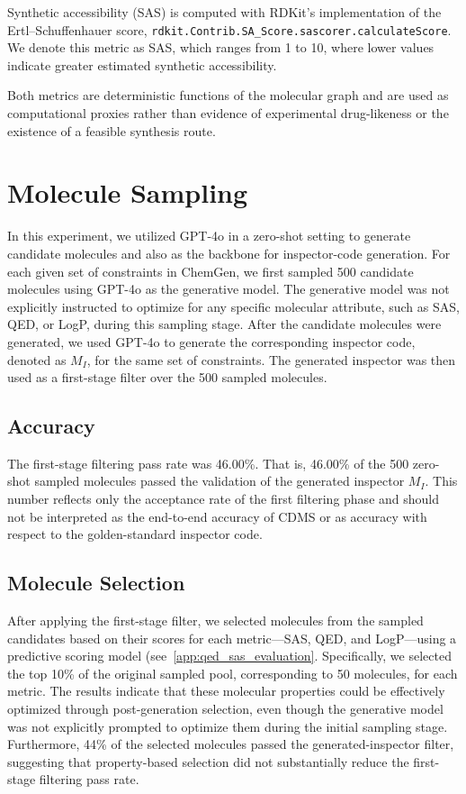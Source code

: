 \documentclass[10pt]{article} %
\begin{document}
    Synthetic accessibility (SAS) is computed with RDKit's implementation of the Ertl--Schuffenhauer score, \texttt{rdkit.Contrib.SA\_Score.sascorer.calculateScore}. We denote this metric as SAS, which ranges from 1 to 10, where lower values indicate greater estimated synthetic accessibility.
    
    Both metrics are deterministic functions of the molecular graph and are used as computational proxies rather than evidence of experimental drug-likeness or the existence of a feasible synthesis route.
    
\section{Molecule Sampling} \label{app:molecule_sampling}

In this experiment, we utilized GPT-4o in a zero-shot setting to generate candidate molecules and also as the backbone for inspector-code generation. For each given set of constraints in ChemGen, we first sampled 500 candidate molecules using GPT-4o as the generative model. The generative model was not explicitly instructed to optimize for any specific molecular attribute, such as SAS, QED, or LogP, during this sampling stage. After the candidate molecules were generated, we used GPT-4o to generate the corresponding inspector code, denoted as $M_I$, for the same set of constraints. The generated inspector was then used as a first-stage filter over the 500 sampled molecules.

\subsection{Accuracy}

The first-stage filtering pass rate was 46.00\%. That is, 46.00\% of the 500 zero-shot sampled molecules passed the validation of the generated inspector $M_I$. This number reflects only the acceptance rate of the first filtering phase and should not be interpreted as the end-to-end accuracy of CDMS or as accuracy with respect to the golden-standard inspector code.

\subsection{Molecule Selection}

After applying the first-stage filter, we selected molecules from the sampled candidates based on their scores for each metric---SAS, QED, and LogP---using a predictive scoring model (see~\ref{app:qed_sas_evaluation}. Specifically, we selected the top 10\% of the original sampled pool, corresponding to 50 molecules, for each metric. The results indicate that these molecular properties could be effectively optimized through post-generation selection, even though the generative model was not explicitly prompted to optimize them during the initial sampling stage. Furthermore, 44\% of the selected molecules passed the generated-inspector filter, suggesting that property-based selection did not substantially reduce the first-stage filtering pass rate.
\end{document}
